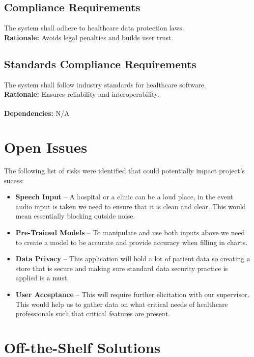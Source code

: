 \documentclass[12pt]{article}
\begin{document}
\begin{itemize}
\subsection{Compliance Requirements}
The system shall adhere to healthcare data protection laws.  \\
\textbf{Rationale:} Avoids legal penalties and builds user trust.

\subsection{Standards Compliance Requirements}
The system shall follow industry standards for healthcare software.  \\
\textbf{Rationale:} Ensures reliability and interoperability. \\
  \\
\textbf{Dependencies:} N/A

\section{Open Issues}

The following list of risks were identified that could potentially impact project's sucess:
\begin{itemize}
  \item \textbf{Speech Input} -- A hospital or a clinic can be a loud place, in the event audio input is taken we need to ensure that it is clean and clear. This would mean essentially blocking outside noise. 
  \item \textbf{Pre-Trained Models} -- To manipulate and use both inputs above we need to create a model to be accurate and provide accuracy when filling in charts. 
  \item \textbf{Data Privacy} -- This application will hold a lot of patient data so creating a store that is secure and making sure standard data security practice is applied is a must.
  \item \textbf{User Acceptance} -- This will require further elicitation with our supervisor. This would help us to gather data on what critical needs of healthcare professionals such that critical features are present. 
\end{itemize}

\section{Off-the-Shelf Solutions}

\end{itemize}
\end{document}
